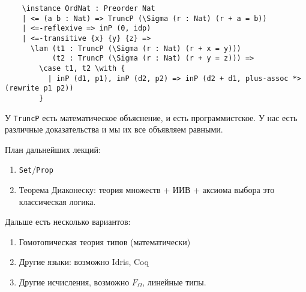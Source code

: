 \begin{verbatim}
    \instance OrdNat : Preorder Nat
    | <= (a b : Nat) => TruncP (\Sigma (r : Nat) (r + a = b))
    | <=-reflexive => inP (0, idp)
    | <=-transitive {x} {y} {z} =>
      \lam (t1 : TruncP (\Sigma (r : Nat) (r + x = y)))
           (t2 : TruncP (\Sigma (r : Nat) (r + y = z))) =>
        \case t1, t2 \with {
          | inP (d1, p1), inP (d2, p2) => inP (d2 + d1, plus-assoc *> (rewrite p1 p2))
        }
\end{verbatim}


У \texttt{TruncP} есть математическое объяснение, и есть программистское. У нас есть различные доказательства и мы их все объявляем равными.

План дальнейших лекций:
\begin{enumerate}
    \item \texttt{Set}/\texttt{Prop}
    \item Теорема Диаконеску: теория множеств + ИИВ + аксиома выбора это классическая логика.
\end{enumerate}

Дальше есть несколько вариантов:
\begin{enumerate}
    \item Гомотопическая теория типов (математически)
    \item Другие языки: возможно Idris, Coq
    \item Другие исчисления, возможно \(F_\Omega\), линейные типы.
\end{enumerate}

